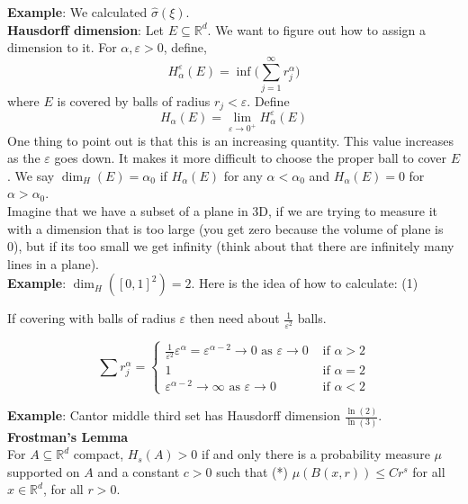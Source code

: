 \documentclass[12pt]{article}
\begin{document}
\noindent \textbf{Example}: We calculated $\hat{\sigma}(\xi)$. \\

\noindent \textbf{Hausdorff dimension}:
\noindent Let $E \subseteq \mathbb{R}^d$. We want to figure out how to assign a dimension to it. For $\alpha, \varepsilon > 0$, define,
$$H_\alpha^\varepsilon(E) = \inf \Big(\sum^\infty_{j=1} r_j^\alpha\Big) $$
where $E$ is covered by balls of radius $r_j < \varepsilon$. Define
$$H_\alpha(E)=\lim_{\varepsilon \rightarrow 0^+} H_\alpha^\varepsilon(E)$$
One thing to point out is that this is an increasing quantity. This value increases as the $\varepsilon$ goes down. It makes it more difficult to choose the proper ball to cover $E$. We say $\dim_H(E) = \alpha_0$ if $H_\alpha(E)$ for any $\alpha < \alpha_0$ and $H_\alpha(E)=0$ for $\alpha > \alpha_0$.  \\

Imagine that we have a subset of a plane in 3D, if we are trying to measure it with a dimension that is too large (you get zero because the volume of plane is 0), but if its too small we get infinity (think about that there are infinitely many lines in a plane). \\

\noindent \textbf{Example}: $\dim_H([0,1]^2) = 2$. Here is the idea of how to calculate:
(1)

\noindent If covering with balls of radius $\varepsilon$ then need about $\frac{1}{\varepsilon^2}$ balls. 

$$\sum r_j^\alpha = \begin{cases} \frac{1}{\varepsilon^2} \varepsilon^\alpha = \varepsilon^{\alpha-2} \rightarrow 0 \text{ as } \varepsilon \rightarrow 0 & \text{ if } \alpha>2 \\ 1 & \text{ if } \alpha = 2 \\ \varepsilon^{\alpha-2} \rightarrow \infty \text{ as } \varepsilon \rightarrow 0 & \text{ if } \alpha < 2 \end{cases}$$

\noindent \textbf{Example}: Cantor middle third set has Hausdorff dimension $\frac{\ln(2)}{\ln(3)}$. \\

\noindent \textbf{Frostman's Lemma} \\
\noindent For $A \subseteq \mathbb{R}^d$ compact, $H_s(A) > 0$ if and only  there is a probability measure $\mu$ supported on $A$ and a constant $c>0$ such that (*) $\mu(B(x,r)) \leq C r^s$ for all $x \in \mathbb{R}^d$, for all $r>0$. \\
\end{document}
